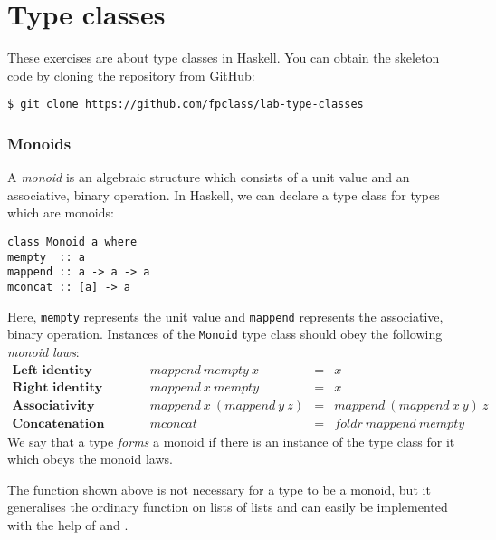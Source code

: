 \section{Type classes}

These exercises are about type classes in Haskell. You can obtain the skeleton code by cloning the repository from GitHub:
\begin{verbatim}
$ git clone https://github.com/fpclass/lab-type-classes
\end{verbatim}

\taskLine 

\subsubsection{Monoids}

A \emph{monoid} is an algebraic structure which consists of a unit value and an associative, binary operation. In Haskell, we can declare a type class for types which are monoids:
\begin{verbatim}
class Monoid a where
mempty  :: a
mappend :: a -> a -> a
mconcat :: [a] -> a
\end{verbatim}
Here, \texttt{mempty} represents the unit value and \texttt{mappend} represents the associative, binary operation. Instances of the \texttt{Monoid} type class should obey the following \emph{monoid laws}:
\begin{displaymath}
\begin{array}{lcrcl}
\textbf{Left identity} &\qquad & \mathit{mappend}~\mathit{mempty}~x & = & x \\
\textbf{Right identity} &\qquad & \mathit{mappend}~x~\mathit{mempty} & = & x \\
\textbf{Associativity} & \qquad & \mathit{mappend}~x~(\mathit{mappend}~y~z) & = & \mathit{mappend}~(\mathit{mappend}~x~y)~z \\
\textbf{Concatenation} & \qquad & \mathit{mconcat} & = & \mathit{foldr}~\mathit{mappend}~\mathit{mempty}
\end{array}
\end{displaymath}
We say that a type \emph{forms} a monoid if there is an instance of the  type class for it which obeys the monoid laws. 

The  function shown above is not necessary for a type to be a monoid, but it generalises the ordinary  function on lists of lists and can easily be implemented with the help of  and .

